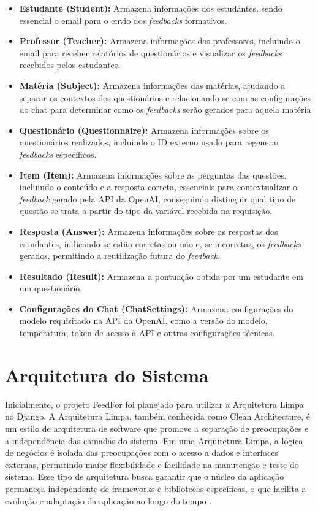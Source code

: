 \begin{itemize}
    \item \textbf{Estudante (Student):} Armazena informações dos estudantes, sendo essencial o email para o envio dos \textit{feedbacks} formativos.
    \item \textbf{Professor (Teacher):} Armazena informações dos professores, incluindo o email para receber relatórios de questionários e visualizar os \textit{feedbacks} recebidos pelos estudantes.
    \item \textbf{Matéria (Subject):} Armazena informações das matérias, ajudando a separar os contextos dos questionários e relacionando-se com as configurações do chat para determinar como os \textit{feedbacks} serão gerados para aquela matéria.
    \item \textbf{Questionário (Questionnaire):} Armazena informações sobre os questionários realizados, incluindo o ID externo usado para regenerar \textit{feedbacks} específicos.
    \item \textbf{Item (Item):} Armazena informações sobre as perguntas das questões, incluindo o conteúdo e a resposta correta, essenciais para contextualizar o \textit{feedback} gerado pela API da OpenAI, conseguindo distinguir qual tipo de questão se trata a partir do tipo da variável recebida na requisição.
    \item \textbf{Resposta (Answer):} Armazena informações sobre as respostas dos estudantes, indicando se estão corretas ou não e, se incorretas, os \textit{feedbacks} gerados, permitindo a reutilização futura do \textit{feedback}.
    \item \textbf{Resultado (Result):} Armazena a pontuação obtida por um estudante em um questionário.
    \item \textbf{Configurações do Chat (ChatSettings):} Armazena configurações do modelo requisitado na API da OpenAI, como a versão do modelo, temperatura, token de acesso à API e outras configurações técnicas.
\end{itemize}

\section{Arquitetura do Sistema}

Inicialmente, o projeto FeedFor foi planejado para utilizar a Arquitetura Limpa no Django. A Arquitetura Limpa, também conhecida como Clean Architecture, é um estilo de arquitetura de software que promove a separação de preocupações e a independência das camadas do sistema. Em uma Arquitetura Limpa, a lógica de negócios é isolada das preocupações com o acesso a dados e interfaces externas, permitindo maior flexibilidade e facilidade na manutenção e teste do sistema. Esse tipo de arquitetura busca garantir que o núcleo da aplicação permaneça independente de frameworks e bibliotecas específicas, o que facilita a evolução e adaptação da aplicação ao longo do tempo \cite{tabnews2023}.

